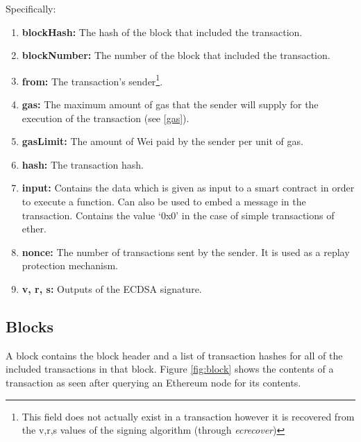 Specifically:
\begin{enumerate}
    \item \textbf{blockHash:} The hash of the block that included the transaction.
    \item \textbf{blockNumber:} The number of the block that included the transaction.
    \item \textbf{from:} The transaction's sender\footnote{This field does not actually exist in a transaction however it is recovered from the v,r,s values of the signing algorithm (through \textit{ecrecover})}.
    \item \textbf{gas:} The maximum amount of gas that the sender will supply for the execution of the transaction (see \ref{gas}).
    \item \textbf{gasLimit:} The amount of Wei paid by the sender per unit of gas.
    \item \textbf{hash:} The transaction hash.
    \item \textbf{input:} Contains the data which is given as input to a smart contract in order to execute a function. Can also be used to embed a message in the transaction. Contains the value `0x0' in the case of simple transactions of ether.
    \item \textbf{nonce:} The number of transactions sent by the sender. It is used as a replay protection mechanism.
    \item \textbf{v, r, s:} Outputs of the ECDSA signature.
\end{enumerate}

\subsection{Blocks} \label{block}
A block contains the block header and a list of transaction hashes for all of the included transactions in that block. Figure \ref{fig:block} shows the contents of a transaction as seen after querying an Ethereum node for its contents.

